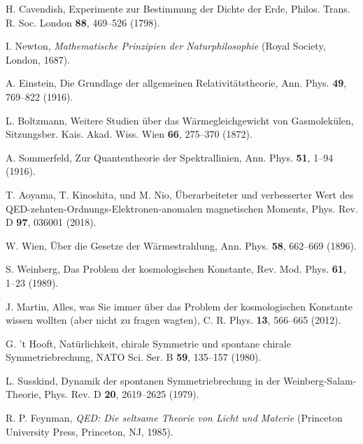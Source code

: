 \documentclass[twocolumn,aps,prl]{revtex4-2}
\begin{document}
{{{{{{{{{{{{{{{{\begin{thebibliography}{99}
																				 H. Cavendish, Experimente zur Bestimmung der Dichte der Erde, Philos. Trans. R. Soc. London \textbf{88}, 469--526 (1798).
																				
																				 I. Newton, \textit{Mathematische Prinzipien der Naturphilosophie} (Royal Society, London, 1687).
																				
																				 A. Einstein, Die Grundlage der allgemeinen Relativitätstheorie, Ann. Phys. \textbf{49}, 769--822 (1916).
																				
																				 L. Boltzmann, Weitere Studien über das Wärmegleichgewicht von Gasmolekülen, Sitzungsber. Kais. Akad. Wiss. Wien \textbf{66}, 275--370 (1872).
																				
																				 A. Sommerfeld, Zur Quantentheorie der Spektrallinien, Ann. Phys. \textbf{51}, 1--94 (1916).
																				
																				 T. Aoyama, T. Kinoshita, und M. Nio, Überarbeiteter und verbesserter Wert des QED-zehnten-Ordnungs-Elektronen-anomalen magnetischen Moments, Phys. Rev. D \textbf{97}, 036001 (2018).
																				
																				 W. Wien, Über die Gesetze der Wärmestrahlung, Ann. Phys. \textbf{58}, 662--669 (1896).
																				
																				 S. Weinberg, Das Problem der kosmologischen Konstante, Rev. Mod. Phys. \textbf{61}, 1--23 (1989).
																				
																				 J. Martin, Alles, was Sie immer über das Problem der kosmologischen Konstante wissen wollten (aber nicht zu fragen wagten), C. R. Phys. \textbf{13}, 566--665 (2012).
																				
																				 G. 't Hooft, Natürlichkeit, chirale Symmetrie und spontane chirale Symmetriebrechung, NATO Sci. Ser. B \textbf{59}, 135--157 (1980).
																				
																				 L. Susskind, Dynamik der spontanen Symmetriebrechung in der Weinberg-Salam-Theorie, Phys. Rev. D \textbf{20}, 2619--2625 (1979).
																				
																				 R. P. Feynman, \textit{QED: Die seltsame Theorie von Licht und Materie} (Princeton University Press, Princeton, NJ, 1985).
																				

\end{thebibliography}}}}}}}}}}}}}}}}}
\end{document}
